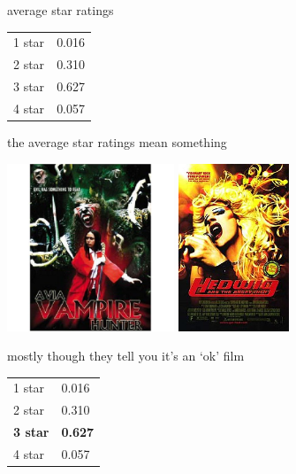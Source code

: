 \documentclass{beamer}
\begin{document}
\begin{frame}{average star ratings}
  \begin{center}
    \begin{tabular}{l|l}
      \hline
      1 star&0.016\\
      2 star&0.310\\
      3 star&0.627\\
      4 star&0.057\\
      \hline
    \end{tabular}
  \end{center}
\end{frame}
\begin{frame}{the average star ratings mean something}
  \begin{center}
    \includegraphics[height=5cm]{avia_vampire_hunter.jpg}
    \includegraphics[height=5cm]{hedwig.jpg}
  \end{center}
\end{frame}
\begin{frame}{mostly though they tell you it's an `ok' film}
  \begin{center}
    \begin{tabular}{l|l}
      \hline
      1 star&0.016\\
      2 star&0.310\\
      \textbf{3 star}&\textbf{0.627}\\
      4 star&0.057\\
      \hline
    \end{tabular}
  \end{center}
\end{frame}
\end{document}
